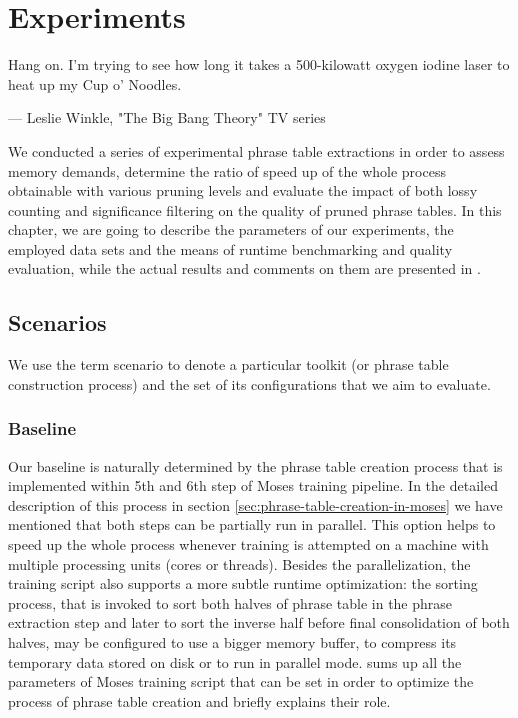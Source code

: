 \chapter{Experiments}
\label{chap:experiments}

\setlength{\epigraphwidth}{1.0\textwidth}
\epigraph{Hang on. I'm trying to see how long it takes a 500-kilowatt oxygen iodine laser to heat up my Cup o' Noodles.}{--- Leslie Winkle, "The Big Bang Theory" TV series}

We conducted a series of experimental phrase table extractions in order to
assess \eppex{} memory demands, determine the ratio of speed up of the whole
process obtainable with various pruning levels and evaluate the impact of both
lossy counting and significance filtering on the quality of pruned phrase tables.
In this chapter, we are going to describe the parameters of our experiments,
the employed data sets and the means of runtime benchmarking and quality
evaluation, while the actual results and comments on them are presented in
.

\section{Scenarios}

We use the term scenario to denote a particular toolkit (or phrase table construction process)
and the set of its configurations that we aim to evaluate.

\subsection{Baseline}
\label{sec:baseline-experiments}

Our baseline is naturally determined by the phrase table creation process
that is implemented within 5th and 6th step of Moses training pipeline.
In the detailed description of this process in section \ref{sec:phrase-table-creation-in-moses}
we have mentioned that both steps can be partially run in parallel.
This option helps to speed up the whole process whenever training is
attempted on a machine with multiple processing units (cores or threads).
Besides the parallelization, the training script also supports a more subtle
runtime optimization: the sorting process, that is invoked to sort both halves
of phrase table in the phrase extraction step and later to sort the inverse
half before final consolidation of both halves, may be configured to use a bigger
memory buffer, to compress its temporary data stored on disk or to run in parallel mode.
 sums up all the parameters of Moses
training script that can be set in order to optimize the process of phrase
table creation and briefly explains their role.

